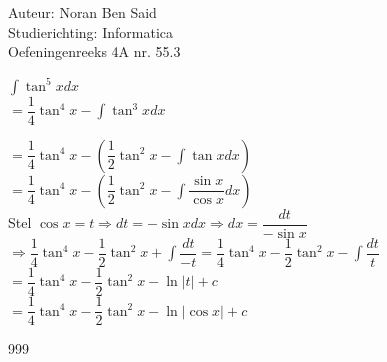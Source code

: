 \documentclass[a4paper]{article}
\begin{document}
\noindent \large Auteur: Noran Ben Said\\
\noindent \large Studierichting: Informatica\\
\noindent \large Oefeningenreeks 4A nr. 55.3 \\

\medskip
\normalsize

$ \displaystyle\int \tan^5 x dx $ \\

$ = \dfrac{1}{4} \tan^4 x - \displaystyle\int \tan^3xdx$

$ = \dfrac{1}{4} \tan^4 x - \left(\dfrac{1}{2} \tan^2x -\displaystyle\int \tan xdx \right) $ \\

$ = \dfrac{1}{4} \tan^4 x - \left(\dfrac{1}{2} \tan^2x -\displaystyle\int \dfrac{\sin x}{\cos x} dx \right) $ \\

Stel $\cos x = t \Rightarrow{dt = - \sin x dx} \Rightarrow{dx = \dfrac{dt}{-\sin x}}$\\


$ \Rightarrow{}\dfrac{1}{4} \tan^4 x - \dfrac{1}{2} \tan^2x + \displaystyle\int \dfrac{dt}{- t} =\dfrac{1}{4} \tan^4 x - \dfrac{1}{2} \tan^2x - \displaystyle\int \dfrac{dt}{t} $ \\

$ =\dfrac{1}{4} \tan^4 x - \dfrac{1}{2} \tan^2x - \ln|t| + c$ \\

$ =\dfrac{1}{4} \tan^4 x - \dfrac{1}{2} \tan^2x - \ln|\cos x| + c$ \\

\begin{thebibliography}{999}
\end{thebibliography}
\end{document}

